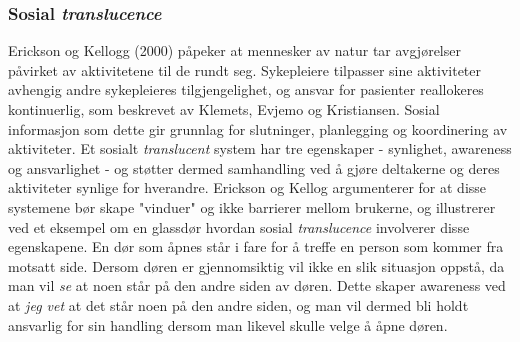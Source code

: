 \subsubsection{Sosial \emph{translucence}}
Erickson og Kellogg (2000) påpeker at mennesker av natur tar avgjørelser påvirket av aktivitetene til de rundt seg. Sykepleiere tilpasser sine aktiviteter avhengig andre sykepleieres tilgjengelighet, og ansvar for pasienter reallokeres kontinuerlig, som beskrevet av Klemets, Evjemo og Kristiansen. Sosial informasjon som dette gir grunnlag for slutninger, planlegging og koordinering av aktiviteter. 
Et sosialt \emph{translucent} system har tre egenskaper - synlighet, awareness og ansvarlighet - og støtter dermed samhandling ved å gjøre deltakerne og deres aktiviteter synlige for hverandre. Erickson og Kellog argumenterer for at disse systemene bør skape "vinduer" og ikke barrierer mellom brukerne, og illustrerer ved et eksempel om en glassdør hvordan sosial \emph{translucence} involverer disse egenskapene. 
En dør som åpnes står i fare for å treffe en person som kommer fra motsatt side. Dersom døren er gjennomsiktig vil ikke en slik situasjon oppstå, da man vil \emph{se} at noen står på den andre siden av døren. Dette skaper awareness ved at \emph{jeg vet} at det står noen på den andre siden, og man vil dermed bli holdt ansvarlig for sin handling dersom man likevel skulle velge å åpne døren.